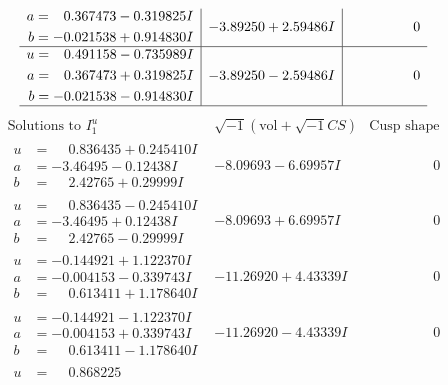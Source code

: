 \documentclass[1p]{elsarticle_modified}
\theoremstyle{definition}
\newcommand{\I}{\sqrt{-1}}
\begin{document}
$$\begin{array}{c|c|c}
\begin{aligned}
a &= \phantom{-}0.367473 - 0.319825 I \\
b &= -0.021538 + 0.914830 I\end{aligned}
 & -3.89250 + 2.59486 I & \phantom{-0.000000 } 0 \\ \hline\begin{aligned}
u &= \phantom{-}0.491158 - 0.735989 I \\
a &= \phantom{-}0.367473 + 0.319825 I \\
b &= -0.021538 - 0.914830 I\end{aligned}
 & -3.89250 - 2.59486 I & \phantom{-0.000000 } 0\\
 \hline 
 \end{array}$$\newpage$$\begin{array}{c|c|c}  
\text{Solutions to }I^u_{1}& \I (\text{vol} + \sqrt{-1}CS) & \text{Cusp shape}\\
 \hline 
\begin{aligned}
u &= \phantom{-}0.836435 + 0.245410 I \\
a &= -3.46495 - 0.12438 I \\
b &= \phantom{-}2.42765 + 0.29999 I\end{aligned}
 & -8.09693 - 6.69957 I & \phantom{-0.000000 } 0 \\ \hline\begin{aligned}
u &= \phantom{-}0.836435 - 0.245410 I \\
a &= -3.46495 + 0.12438 I \\
b &= \phantom{-}2.42765 - 0.29999 I\end{aligned}
 & -8.09693 + 6.69957 I & \phantom{-0.000000 } 0 \\ \hline\begin{aligned}
u &= -0.144921 + 1.122370 I \\
a &= -0.004153 - 0.339743 I \\
b &= \phantom{-}0.613411 + 1.178640 I\end{aligned}
 & -11.26920 + 4.43339 I & \phantom{-0.000000 } 0 \\ \hline\begin{aligned}
u &= -0.144921 - 1.122370 I \\
a &= -0.004153 + 0.339743 I \\
b &= \phantom{-}0.613411 - 1.178640 I\end{aligned}
 & -11.26920 - 4.43339 I & \phantom{-0.000000 } 0 \\ \hline\begin{aligned}
u &= \phantom{-}0.868225\phantom{ +0.000000I} \\

\end{aligned}
\end{array}$$
\end{document}
